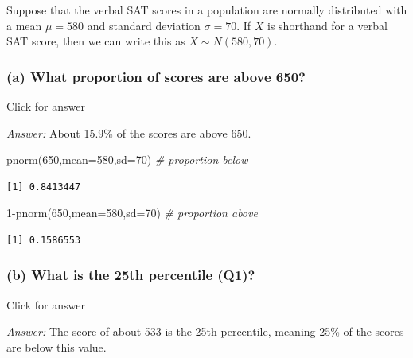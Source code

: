 \documentclass[
]{book}
\newenvironment{Shaded}{\begin{snugshade}}{\end{snugshade}}
\newcommand{\AttributeTok}[1]{\textcolor[rgb]{0.77,0.63,0.00}{#1}}
\newcommand{\CommentTok}[1]{\textcolor[rgb]{0.56,0.35,0.01}{\textit{#1}}}
\newcommand{\DecValTok}[1]{\textcolor[rgb]{0.00,0.00,0.81}{#1}}
\newcommand{\FunctionTok}[1]{\textcolor[rgb]{0.00,0.00,0.00}{#1}}
\newcommand{\NormalTok}[1]{#1}
\newcommand{\SpecialCharTok}[1]{\textcolor[rgb]{0.00,0.00,0.00}{#1}}
\begin{document}
Suppose that the verbal SAT scores in a population are normally distributed with a mean \(\mu=580\) and standard deviation \(\sigma = 70\). If \(X\) is shorthand for a verbal SAT score, then we can write this as \(X \sim N(580,70)\).

\hypertarget{a-what-proportion-of-scores-are-above-650}{%
\subsubsection{(a) What proportion of scores are above 650?}\label{a-what-proportion-of-scores-are-above-650}}

Click for answer

\emph{Answer:} About 15.9\% of the scores are above 650.

\begin{Shaded}
\begin{Highlighting}[]
\FunctionTok{pnorm}\NormalTok{(}\DecValTok{650}\NormalTok{,}\AttributeTok{mean=}\DecValTok{580}\NormalTok{,}\AttributeTok{sd=}\DecValTok{70}\NormalTok{) }\CommentTok{\# proportion below}
\end{Highlighting}
\end{Shaded}

\begin{verbatim}
[1] 0.8413447
\end{verbatim}

\begin{Shaded}
\begin{Highlighting}[]
\DecValTok{1}\SpecialCharTok{{-}}\FunctionTok{pnorm}\NormalTok{(}\DecValTok{650}\NormalTok{,}\AttributeTok{mean=}\DecValTok{580}\NormalTok{,}\AttributeTok{sd=}\DecValTok{70}\NormalTok{) }\CommentTok{\# proportion above}
\end{Highlighting}
\end{Shaded}

\begin{verbatim}
[1] 0.1586553
\end{verbatim}

\hypertarget{b-what-is-the-25th-percentile-q1}{%
\subsubsection{(b) What is the 25th percentile (Q1)?}\label{b-what-is-the-25th-percentile-q1}}

Click for answer

\emph{Answer:} The score of about 533 is the 25th percentile, meaning 25\% of the scores are below this value.
\end{document}
